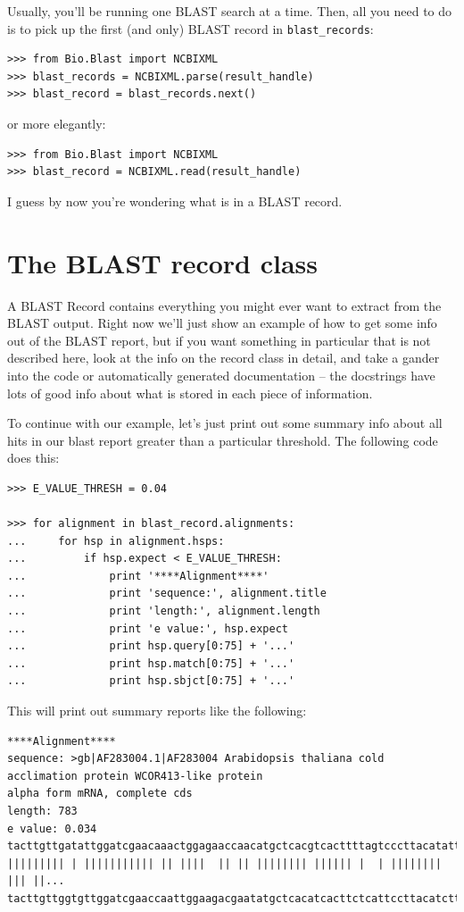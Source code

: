 \documentclass{report}
\begin{document}
Usually, you'll be running one BLAST search at a time. Then, all you need
to do is to pick up the first (and only) BLAST record in \verb|blast_records|:
\begin{verbatim}
>>> from Bio.Blast import NCBIXML
>>> blast_records = NCBIXML.parse(result_handle)
>>> blast_record = blast_records.next()
\end{verbatim}
\noindent or more elegantly:
\begin{verbatim}
>>> from Bio.Blast import NCBIXML
>>> blast_record = NCBIXML.read(result_handle)
\end{verbatim}

I guess by now you're wondering what is in a BLAST record.

\section{The BLAST record class}

A BLAST Record contains everything you might ever want to extract from the
BLAST output. Right now we'll just show
an example of how to get some info out of the BLAST report, but if you
want something in particular that is not described here, look at the
info on the record class in detail, and take a gander into the code or
automatically generated documentation -- the docstrings have lots of
good info about what is stored in each piece of information.

To continue with our example, let's just print out some summary info
about all hits in our blast report greater than a particular
threshold. The following code does this:

\begin{verbatim}
>>> E_VALUE_THRESH = 0.04

>>> for alignment in blast_record.alignments:
...     for hsp in alignment.hsps:
...         if hsp.expect < E_VALUE_THRESH:
...             print '****Alignment****'
...             print 'sequence:', alignment.title
...             print 'length:', alignment.length
...             print 'e value:', hsp.expect
...             print hsp.query[0:75] + '...'
...             print hsp.match[0:75] + '...'
...             print hsp.sbjct[0:75] + '...'
\end{verbatim}

This will print out summary reports like the following:

\begin{verbatim}
****Alignment****
sequence: >gb|AF283004.1|AF283004 Arabidopsis thaliana cold acclimation protein WCOR413-like protein
alpha form mRNA, complete cds
length: 783
e value: 0.034
tacttgttgatattggatcgaacaaactggagaaccaacatgctcacgtcacttttagtcccttacatattcctc...
||||||||| | ||||||||||| || ||||  || || |||||||| |||||| |  | |||||||| ||| ||...
tacttgttggtgttggatcgaaccaattggaagacgaatatgctcacatcacttctcattccttacatcttcttc...
\end{verbatim}
\end{document}
